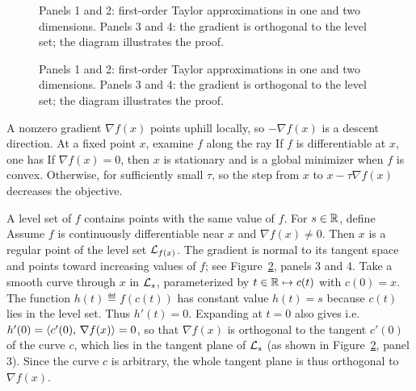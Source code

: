 \begin{figure}[tbp]
\centering
{}\hfill
{}
\caption{Panels 1 and 2: first-order Taylor approximations in one and two dimensions.
	Panels 3 and 4: the gradient is orthogonal to the level set; the diagram illustrates the proof.}
\label{fig-expansion-taylor}
\end{figure}
\begin{figure}[tbp]
\BookContinuedFigure
\centering
{}\hfill
{}
\caption{Panels 1 and 2: first-order Taylor approximations in one and two dimensions.
	Panels 3 and 4: the gradient is orthogonal to the level set; the diagram illustrates the proof.}
\label{fig-expansion-taylor-continued}
\end{figure}

A nonzero gradient $\nabla f(x)$ points uphill locally, so $-\nabla f(x)$ is a descent direction. At a fixed point $x$, examine $f$ along the ray
\eq{ 
	\tau \in \RR^+ = [0,+\infty[ \longmapsto f(x-\tau \nabla f(x)) \in \RR.
}
If $f$ is differentiable at $x$, one has 
If $\nabla f(x)=0$, then $x$ is stationary and is a global minimizer when $f$ is convex. Otherwise, for sufficiently small $\tau$,
so the step from $x$ to $x-\tau \nabla f(x)$ decreases the objective.

\begin{rem}
	A level set of $f$ contains points with the same value of $f$. For $s \in \mathbb{R}$, define
	Assume $f$ is continuously differentiable near $x$ and $\nabla f(x)\neq0$. Then $x$ is a regular point of the level set $\mathcal{L}_{f(x)}$. The gradient is normal to its tangent space and points toward increasing values of $f$; see Figure~\ref{fig-expansion-taylor-continued}, panels 3 and 4.
	Take a smooth curve through $x$ in $\mathcal{L}_s$, parameterized by $t \in \mathbb{R} \mapsto c(t)$ with $c(0)=x$.
	The function $h(t) \eqdef f(c(t))$ has constant value $h(t)=s$ because $c(t)$ lies in the level set. Thus $h'(t)=0$. Expanding at $t=0$ also gives
	i.e. $h'(0) = \langle c'(0),\,\nabla f(x)\rangle=0$, so that $\nabla f(x)$ is orthogonal to the tangent $c'(0)$ of the curve $c$, which lies in the tangent plane of $\mathcal{L}_s$  (as shown in Figure~\ref{fig-expansion-taylor-continued}, panel 3).  Since the curve $c$ is arbitrary, the whole tangent plane is thus orthogonal to $\nabla f(x)$.
\end{rem}

